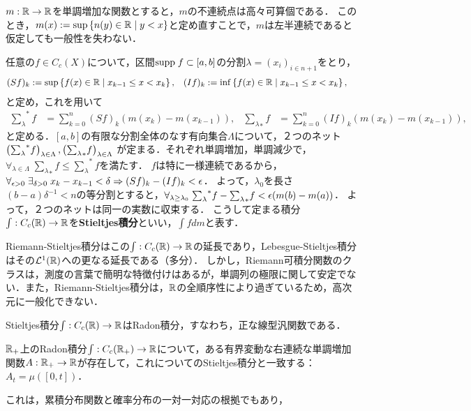 \documentclass[uplatex,dvipdfmx]{jsreport}
\begin{document}
\begin{definition}
    $m:\mathbb{R}\to\mathbb{R}$を単調増加な関数とすると，$m$の不連続点は高々可算個である．
    このとき，$m(x):=\sup\left\{n(y)\in\mathbb{R}\mid y<x\right\}$と定め直すことで，$m$は左半連続であると仮定しても一般性を失わない．

    任意の$f\in C_c(X)$について，区間$\mathrm{supp}\; f\subset[a,b]$の分割$\lambda=(x_i)_{i\in n+1}$をとり，
    \begin{align*}
        (Sf)_k&:=\sup\left\{f(x)\in\mathbb{R}\mid x_{k-1}\le x<x_k\right\},&(If)_k&:=\inf\left\{f(x)\in\mathbb{R}\mid x_{k-1}\le x<x_k\right\},
    \end{align*}
    と定め，これを用いて
    \begin{align*}
        {\sum_{\lambda}}^*f&=\sum_{k=0}^n(Sf)_k(m(x_k)-m(x_{k-1})),&{\sum_{\lambda}}_*f&=\sum_{k=0}^n(If)_k(m(x_k)-m(x_{k-1})),
    \end{align*}
    と定める．$[a,b]$の有限な分割全体のなす有向集合$\Lambda$について，２つのネット$\left({\sum_\lambda}^* f\right)_{\lambda\in\Lambda},\left({\sum_\lambda}_*f\right)_{\lambda\in\Lambda}$
    が定まる．それぞれ単調増加，単調減少で，$\forall_{\lambda\in\Lambda}\;{\sum_\lambda}_*f\le{\sum_\lambda}^*f$を満たす．
    $f$は特に一様連続であるから，$\forall_{\epsilon>0}\;\exists_{\delta>0}\;x_k-x_{k-1}<\delta\Rightarrow(Sf)_k-(If)_k<\epsilon$．
    よって，$\lambda_0$を長さ$(b-a)\delta^{-1}<n$の等分割とすると，$\forall_{\lambda\ge\lambda_0}\;{\sum_\lambda}^*f-{\sum_\lambda}_*f<\epsilon(m(b)-m(a))$．
    よって，２つのネットは同一の実数に収束する．
    こうして定まる積分$\int:C_c(\mathbb{R})\to\mathbb{R}$を\textbf{Stieltjes積分}といい，$\int fdm$と表す．
\end{definition}
\begin{remarks}
    Riemann-Stieltjes積分はこの$\int:C_c(\mathbb{R})\to\mathbb{R}$の延長であり，Lebesgue-Stieltjes積分はその$\mathcal{L}^1(\mathbb{R})$への更なる延長である（多分）．
    しかし，Riemann可積分関数のクラスは，測度の言葉で簡明な特徴付けはあるが，単調列の極限に関して安定でない．また，Riemann-Stieltjes積分は，$\mathbb{R}$の全順序性により過ぎているため，高次元に一般化できない．
\end{remarks}

\begin{lemma}
    Stieltjes積分$\int:C_c(\mathbb{R})\to\mathbb{R}$はRadon積分，すなわち，正な線型汎関数である．
\end{lemma}

\begin{theorem}
    $\mathbb{R}_+$上のRadon積分$\int:C_c(\mathbb{R}_+)\to\mathbb{R}$について，ある有界変動な右連続な単調増加関数$A:\mathbb{R}_+\to\mathbb{R}$が存在して，これについてのStieltjes積分と一致する：$A_t=\mu([0,t])$．
\end{theorem}
\begin{remarks}
    これは，累積分布関数と確率分布の一対一対応の根拠でもあり，
\end{remarks}
\end{document}
